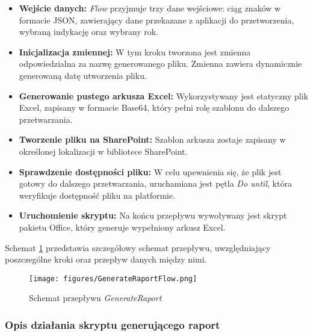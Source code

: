 \begin{itemize}
    \item \textbf{Wejście danych:} \emph{Flow} przyjmuje trzy dane wejściowe: ciąg znaków w formacie JSON, zawierający dane przekazane z aplikacji do przetworzenia, wybraną indykację oraz wybrany rok.
    \item \textbf{Inicjalizacja zmiennej:} W tym kroku tworzona jest zmienna odpowiedzialna za nazwę generowanego pliku. Zmienna zawiera dynamicznie generowaną datę utworzenia pliku.
    \item \textbf{Generowanie pustego arkusza Excel:} Wykorzystywany jest statyczny plik Excel, zapisany w formacie Base64, który pełni rolę szablonu do dalszego przetwarzania.
    \item \textbf{Tworzenie pliku na SharePoint:} Szablon arkusza zostaje zapisany w określonej lokalizacji w bibliotece SharePoint.
    \item \textbf{Sprawdzenie dostępności pliku:} W celu upewnienia się, że plik jest gotowy do dalszego przetwarzania, uruchamiana jest pętla \emph{Do until}, która weryfikuje dostępność pliku na platformie.
    \item \textbf{Uruchomienie skryptu:} Na końcu przepływu wywoływany jest skrypt pakietu Office, który generuje wypełniony arkusz Excel.
\end{itemize}

Schemat \ref{fig:generateflowcomponent} przedstawia szczegółowy schemat przepływu, uwzględniający poszczególne kroki oraz przepływ danych między nimi.

\begin{figure}[H]
    \centering
    \texttt{[image: figures/GenerateRaportFlow.png]}
    \caption{Schemat przepływu \emph{GenerateRaport}}
    \label{fig:generateflowcomponent}
\end{figure}

\subsubsection*{Opis działania skryptu generującego raport}

